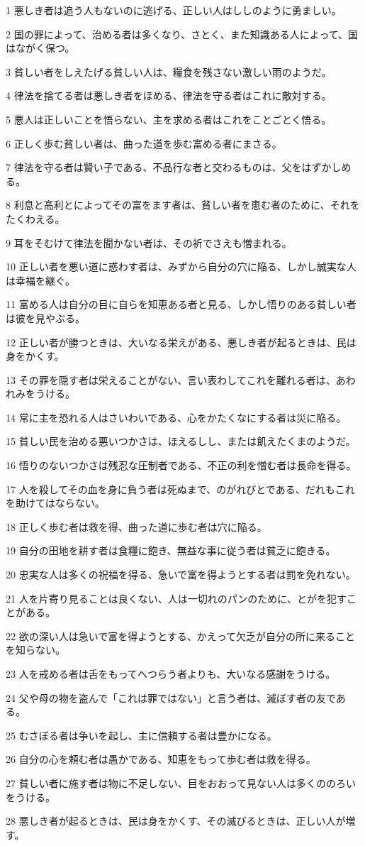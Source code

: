 \par 1 悪しき者は追う人もないのに逃げる、正しい人はししのように勇ましい。
\par 2 国の罪によって、治める者は多くなり、さとく、また知識ある人によって、国はながく保つ。
\par 3 貧しい者をしえたげる貧しい人は、糧食を残さない激しい雨のようだ。
\par 4 律法を捨てる者は悪しき者をほめる、律法を守る者はこれに敵対する。
\par 5 悪人は正しいことを悟らない、主を求める者はこれをことごとく悟る。
\par 6 正しく歩む貧しい者は、曲った道を歩む富める者にまさる。
\par 7 律法を守る者は賢い子である、不品行な者と交わるものは、父をはずかしめる。
\par 8 利息と高利とによってその富をます者は、貧しい者を恵む者のために、それをたくわえる。
\par 9 耳をそむけて律法を聞かない者は、その祈でさえも憎まれる。
\par 10 正しい者を悪い道に惑わす者は、みずから自分の穴に陥る、しかし誠実な人は幸福を継ぐ。
\par 11 富める人は自分の目に自らを知恵ある者と見る、しかし悟りのある貧しい者は彼を見やぶる。
\par 12 正しい者が勝つときは、大いなる栄えがある、悪しき者が起るときは、民は身をかくす。
\par 13 その罪を隠す者は栄えることがない、言い表わしてこれを離れる者は、あわれみをうける。
\par 14 常に主を恐れる人はさいわいである、心をかたくなにする者は災に陥る。
\par 15 貧しい民を治める悪いつかさは、ほえるしし、または飢えたくまのようだ。
\par 16 悟りのないつかさは残忍な圧制者である、不正の利を憎む者は長命を得る。
\par 17 人を殺してその血を身に負う者は死ぬまで、のがれびとである、だれもこれを助けてはならない。
\par 18 正しく歩む者は救を得、曲った道に歩む者は穴に陥る。
\par 19 自分の田地を耕す者は食糧に飽き、無益な事に従う者は貧乏に飽きる。
\par 20 忠実な人は多くの祝福を得る、急いで富を得ようとする者は罰を免れない。
\par 21 人を片寄り見ることは良くない、人は一切れのパンのために、とがを犯すことがある。
\par 22 欲の深い人は急いで富を得ようとする、かえって欠乏が自分の所に来ることを知らない。
\par 23 人を戒める者は舌をもってへつらう者よりも、大いなる感謝をうける。
\par 24 父や母の物を盗んで「これは罪ではない」と言う者は、滅ぼす者の友である。
\par 25 むさぼる者は争いを起し、主に信頼する者は豊かになる。
\par 26 自分の心を頼む者は愚かである、知恵をもって歩む者は救を得る。
\par 27 貧しい者に施す者は物に不足しない、目をおおって見ない人は多くののろいをうける。
\par 28 悪しき者が起るときは、民は身をかくす、その滅びるときは、正しい人が増す。

